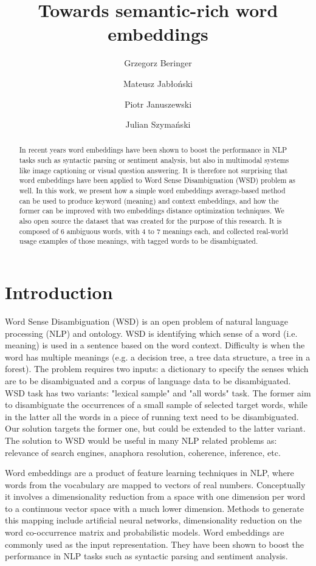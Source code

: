\documentclass{llncs}
\title{Towards semantic-rich word embeddings}
\author{Grzegorz Beringer \and Mateusz Jabłoński \and Piotr Januszewski \and Julian Szymański}
\institute{
Faculty of Electronic Telecommunications and Informatics\\
Gda{\'n}sk University of Technology, Gda{\'n}sk, Poland
}
\begin{document}
\maketitle
\begin{abstract}

In recent years word embeddings have been shown to boost the performance in NLP tasks such as syntactic parsing or sentiment analysis, but also in multimodal systems like image captioning or visual question answering.
It is therefore not surprising that word embeddings have been applied to Word Sense Disambiguation (WSD) problem as well.
In this work, we present how a simple word embeddings average-based method can be used to produce keyword (meaning) and context embeddings, and how the former can be improved with two embeddings distance optimization techniques.
We also open source the dataset that was created for the purpose of this research.
It is composed of 6 ambiguous words, with 4 to 7 meanings each, and collected real-world usage examples of those meanings, with tagged words to be disambiguated.

\end{abstract}

\section{Introduction}
\label{introduction}

Word Sense Disambiguation (WSD) is an open problem of natural language processing (NLP) and ontology. WSD is identifying which sense of a word (i.e. meaning) is used in a sentence based on the word context. Difficulty is when the word has multiple meanings (e.g. a decision tree, a tree data structure, a tree in a forest). The problem requires two inputs: a dictionary to specify the senses which are to be disambiguated and a corpus of language data to be disambiguated. WSD task has two variants: "lexical sample" and "all words" task. The former aim to disambiguate the occurrences of a small sample of selected target words, while in the latter all the words in a piece of running text need to be disambiguated. Our solution targets the former one, but could be extended to the latter variant.
The solution to WSD would be useful in many NLP related problems as: relevance of search engines, anaphora resolution, coherence, inference, etc.

Word embeddings are a product of feature learning techniques in NLP, where words from the vocabulary are mapped to vectors of real numbers. Conceptually it involves a dimensionality reduction from a space with one dimension per word to a continuous vector space with a much lower dimension.
Methods to generate this mapping include artificial neural networks\cite{word2vec}\cite{GloVe}\cite{fastText}, dimensionality reduction on the word co-occurrence matrix\cite{Levy2014NWE} and probabilistic models\cite{Globerson2007EEC}.
Word embeddings are commonly used as the input representation. They have been shown to boost the performance in NLP tasks such as syntactic parsing\cite{parsingGrammars} and sentiment analysis\cite{sentimentAnalysis}.
\end{document}
